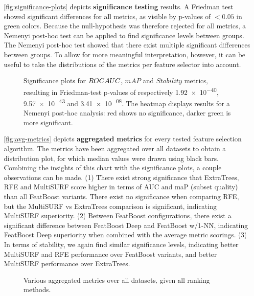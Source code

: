 \documentclass{article}
\begin{document}
\autoref{fig:significance-plots} depicts \textbf{significance testing} results. A Friedman test showed significant differences for all metrics, as visible by p-values of $< 0.05$ in green colors. Because the null-hypothesis was therefore rejected for all metrics, a Nemenyi post-hoc test can be applied to find significance levels between groups. The Nemenyi post-hoc test showed that there exist multiple significant differences between groups. To allow for more meaningful interpretation, however, it can be useful to take the distributions of the metrics per feature selector into account.

\begin{figure}[ht]
\centering



\caption{Significance plots for $ROC\-AUC$, $mAP$ and $Stability$ metrics, resulting in Friedman-test p-values of respectively \num{1.92e-40}, \num{9.57e-43} and \num{3.41e-08}. The heatmap displays results for a Nemenyi post-hoc analysis: red shows no significance, darker green is more significant.}
\label{fig:significance-plots}
\end{figure}

\autoref{fig:avg-metrics} depicts \textbf{aggregated metrics} for every tested feature selection algorithm. The metrics have been aggregated over all datasets to obtain a distribution plot, for which median values were drawn using black bars. Combining the insights of this chart with the significance plots, a couple observations can be made. (1) There exist strong significance that ExtraTrees, RFE and MultiSURF score higher in terms of AUC and maP (subset quality) than all FeatBoost variants. There exist no significance when comparing RFE, but the MultiSURF vs ExtraTrees comparison is significant, indicating MultiSURF superiority. (2) Between FeatBoost configurations, there exist a significant difference between FeatBoost Deep and FeatBoost w/1-NN, indicating FeatBoost Deep superiority when combined with the average metric scorings. (3) In terms of stability, we again find similar significance levels, indicating better MultiSURF and RFE performance over FeatBoost variants, and better MultiSURF performance over ExtraTrees.

\begin{figure}[ht]
\centering

\caption{Various aggregated metrics over all datasets, given all ranking methods. }
\label{fig:avg-metrics}
\end{figure}
\end{document}
